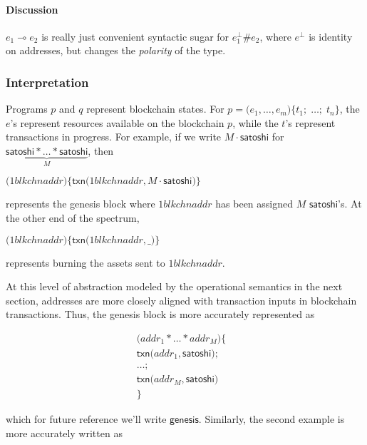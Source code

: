 \documentclass[]{acm_proc_article-sp}
\numberwithin{equation}{subsection}
\begin{document}
\paragraph{Discussion}
$e_1 \multimap e_2$ is really just convenient syntactic sugar for
$e_1^{\perp} \# e_2$, where $e^{\perp}$ is identity on addresses, but
changes the \emph{polarity} of the type.

\subsubsection{Interpretation}
Programs $p$ and $q$ represent blockchain states. For $p = \mathsf{(}
e_1, \ldots, e_m \mathsf{)} \mathsf{\{} t_1 \mathsf{;} \; \ldots
\mathsf{;} \; t_n \mathsf{\}}$, the $e$'s represent resources
available on the blockchain $p$, while the $t$'s represent
transactions in progress. For example, if we write $M \cdot \mathsf{satoshi}$ for $\underbrace{\mathsf{satoshi} * \ldots * \mathsf{satoshi}}_{M}$, then 

$\mathsf{(} 1blkchnaddr {)} \mathsf{\{} \mathsf{txn}\mathsf{(} 1blkchnaddr, M \cdot \mathsf{satoshi} \mathsf{)} \mathsf{\}}$

represents the genesis block where $1blkchnaddr$ has been assigned $M$
$\mathsf{satoshi}$'s. At the other end of the spectrum,

$\mathsf{(} 1blkchnaddr {)} \mathsf{\{} \mathsf{txn}\mathsf{(} 1blkchnaddr, \mathsf{\_} \mathsf{)} \mathsf{\}}$

represents burning the assets sent to $1blkchnaddr$.

At this level of abstraction modeled by the operational semantics in
the next section, addresses are more closely aligned with transaction
inputs in blockchain transactions. Thus, the genesis block is more
accurately represented as 

\begin{equation*}
  \begin{aligned} 
    \mathsf{(} addr_1 * \ldots * addr_M {)} \mathsf{\{} & \\
    \mathsf{txn}\mathsf{(} addr_1, \mathsf{satoshi} \mathsf{)} \mathsf{;} \\
    \ldots \mathsf{;} & \\
    \mathsf{txn}\mathsf{(}addr_M, \mathsf{satoshi} \mathsf{)} \\
    \mathsf{\}} &
  \end{aligned} 
\end{equation*}

which for future reference we'll write $\mathsf{genesis}$. Similarly,
the second example is more accurately written as
\end{document}
